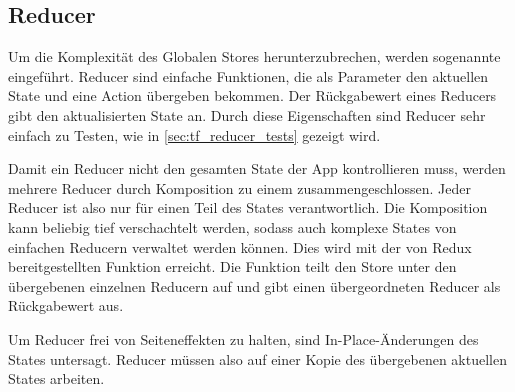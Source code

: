 \subsection{Reducer}
\label{ssec:gr_reducer}

Um die Komplexität des Globalen Stores herunterzubrechen, werden sogenannte
 eingeführt.  Reducer sind einfache Funktionen, die
als Parameter den aktuellen State und eine Action übergeben bekommen.  Der
Rückgabewert eines Reducers gibt den aktualisierten State an.  Durch diese
Eigenschaften sind Reducer sehr einfach zu Testen, wie in
\cref{sec:tf_reducer_tests} gezeigt wird.

Damit ein Reducer nicht den gesamten State der App kontrollieren muss, werden
mehrere Reducer durch Komposition zu einem zusammengeschlossen.  Jeder Reducer
ist also nur für einen Teil des States verantwortlich.  Die Komposition kann
beliebig tief verschachtelt werden, sodass auch komplexe States von einfachen
Reducern verwaltet werden können.  Dies wird mit der von Redux bereitgestellten
Funktion  erreicht.  Die Funktion teilt den Store unter
den übergebenen einzelnen Reducern auf und gibt einen übergeordneten Reducer als
Rückgabewert aus.

Um Reducer frei von Seiteneffekten zu halten, sind In-Place-Änderungen des
States untersagt.  Reducer müssen also auf einer Kopie des übergebenen aktuellen
States arbeiten.
